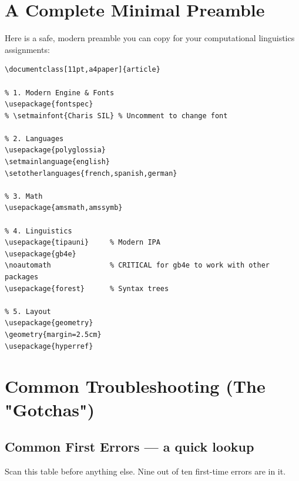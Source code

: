 \documentclass[11pt,a4paper]{article}
\begin{document}
\section{A Complete Minimal Preamble}

Here is a safe, modern preamble you can copy for your computational linguistics assignments:

\begin{lstlisting}
\documentclass[11pt,a4paper]{article}

% 1. Modern Engine & Fonts
\usepackage{fontspec}
% \setmainfont{Charis SIL} % Uncomment to change font

% 2. Languages
\usepackage{polyglossia}
\setmainlanguage{english}
\setotherlanguages{french,spanish,german}

% 3. Math
\usepackage{amsmath,amssymb}

% 4. Linguistics
\usepackage{tipauni}     % Modern IPA
\usepackage{gb4e}
\noautomath              % CRITICAL for gb4e to work with other packages
\usepackage{forest}      % Syntax trees

% 5. Layout
\usepackage{geometry}
\geometry{margin=2.5cm}
\usepackage{hyperref}
\end{lstlisting}

\section{Common Troubleshooting (The "Gotchas")}

\subsection{Common First Errors — a quick lookup}

Scan this table before anything else. Nine out of ten first-time errors are in it.
\end{document}
